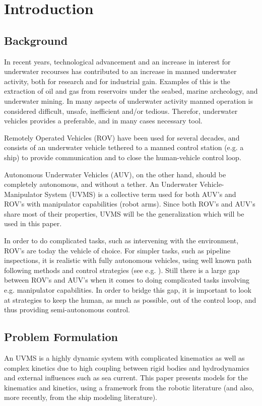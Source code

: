 \section{Introduction}
\subsection{Background}
In recent years, technological advancement and an increase in interest for underwater recourses has contributed to an increase in manned underwater activity, both for research and for industrial gain. Examples of this is the extraction of oil and gas from reservoirs under the seabed, marine archeology, and underwater mining. In many aspects of underwater activity manned operation is considered difficult, unsafe, inefficient and/or tedious. Therefor, underwater vehicles provides a preferable, and in many cases necessary tool. 

Remotely Operated Vehicles (ROV) have been used for several decades, and consists of an underwater vehicle tethered to a manned control station (e.g. a ship) to provide communication and to close the human-vehicle control loop.  

Autonomous Underwater Vehicles (AUV), on the other hand, should be completely autonomous, and without a tether. An Underwater Vehicle-Manipulator System (UVMS) is a collective term used for both AUV's and ROV's with manipulator capabilities (robot arms). Since both ROV's and AUV's share most of their properties, UVMS will be the generalization which will be used in this paper. 

In order to do complicated tasks, such as intervening  with the environment, ROV's are today the vehicle of choice. For simpler tasks, such as pipeline inspections, it is realistic with fully autonomous vehicles, using well known path following methods and control strategies (see e.g. \cite{fs}).  
Still there is a large gap between ROV's and AUV's when it comes to doing complicated tasks involving e.g. manipulator capabilities. In order to bridge this gap, it is important to look at strategies to keep the human, as much as possible, out of the control loop, and thus providing semi-autonomous control. 

\subsection{Problem Formulation}
An UVMS is a highly dynamic system with complicated kinematics as well as complex kinetics due to high coupling between rigid bodies and hydrodynamics and external influences such as sea current. This paper presents models for the kinematics and kinetics, using a framework from the robotic literature (and also, more recently, from the ship modeling literature).

